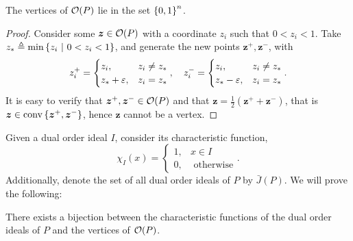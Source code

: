 \documentclass[11pt]{article}
\begin{document}
\begin{claim}
The vertices of $\mathcal{O}(P)$ lie in the set $\left\{ 0, 1 \right\}^n$.
\label{claim:0_1_vert}
\end{claim}
\begin{proof}
Consider some $\bm{z} \in \mathcal{O}(P)$ with a coordinate $z_i$ such that $0 < z_i <
1$. Take $z_* \triangleq \min\left\{ z_i \ \middle| \  0 < z_i < 1 \right\}$, and generate the new
points $\bm{z}^+, \bm{z}^-$, with
\[	z^+_i = \begin{cases}
    z_i, & z_i \neq z_* \\
    z_* + \varepsilon, & z_i = z_*
\end{cases}, \quad
z^-_i = \begin{cases}
    z_i, & z_i \neq z_* \\
    z_* - \varepsilon, & z_i = z_*
\end{cases}.
\] It is easy to verify that $\bm{z}^+, \bm{z}^- \in \mathcal{O}(P)$ and that
$\bm{z} = \frac{1}{2}\left( \bm{z}^+ + \bm{z}^- \right)$, that is $\bm{z}
\in \mathrm{conv}\left\{ \bm{z}^+, \bm{z}^- \right\}$, hence $\bm{z}$ cannot be a vertex.
\end{proof}
Given a dual order ideal $I$, consider its characteristic function,
\[
    \chi_I(x) = \begin{cases}
        1, & x \in I \\
        0, & \text{ otherwise}
    \end{cases}.
\]
Additionally, denote the set of all dual order ideals of $P$ by $\bar{J}(P)$.
We will prove the following:
\begin{claim}
    There exists a bijection between the characteristic functions of the dual
    order ideals of $P$ and the vertices of $\mathcal{O}(P)$.
\end{claim}
\end{document}
